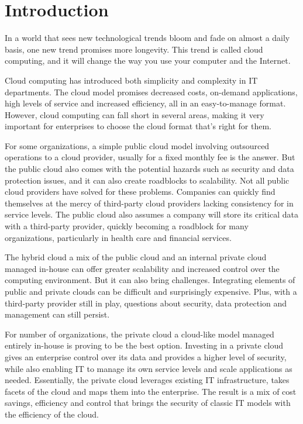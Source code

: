 \chapter{Introduction}
\makeatletter

In a world that sees new technological trends bloom and fade on almost a daily basis, one new trend promises more longevity. This trend is called cloud computing, and it will change the way you use your computer and the Internet\cite{miller}.

\par Cloud computing has introduced both simplicity and complexity in IT departments. The cloud model promises decreased costs, on-demand applications, high levels of service and increased efficiency, all in an easy-to-manage format. However, cloud computing can fall short in several areas, making it very important for enterprises to choose the cloud format that’s right for them.

\par For some organizations, a simple public cloud model involving outsourced operations to a cloud provider, usually for a fixed monthly fee is the answer. But the public cloud also comes with the potential hazards such as security and data protection issues, and it can also create roadblocks to scalability. Not all public cloud providers have solved for these problems. Companies can quickly find themselves at the mercy of third-party cloud providers lacking consistency for in service levels. The public cloud also assumes a company will store its critical data with a third-party provider, quickly becoming a roadblock for many organizations, particularly in health care and financial services. 

\par The hybrid cloud a mix of the public cloud and an internal private cloud managed in-house can offer greater scalability and increased control over the computing environment. But it can also bring challenges. Integrating elements of public and private clouds can be difficult and surprisingly expensive. Plus, with a third-party provider still in play, questions about security, data protection and management can still persist. 

\par For number of organizations, the private cloud a cloud-like model managed entirely in-house is proving to be the best option. Investing in a private cloud gives an enterprise control over its data and provides a higher level of security, while also enabling IT to manage its own service levels and scale applications as needed. Essentially, the private cloud leverages existing IT infrastructure, takes facets of the cloud and maps them into the enterprise. The result is a mix of cost savings, efficiency and control that brings the security of classic IT models with the efficiency of the cloud. 

